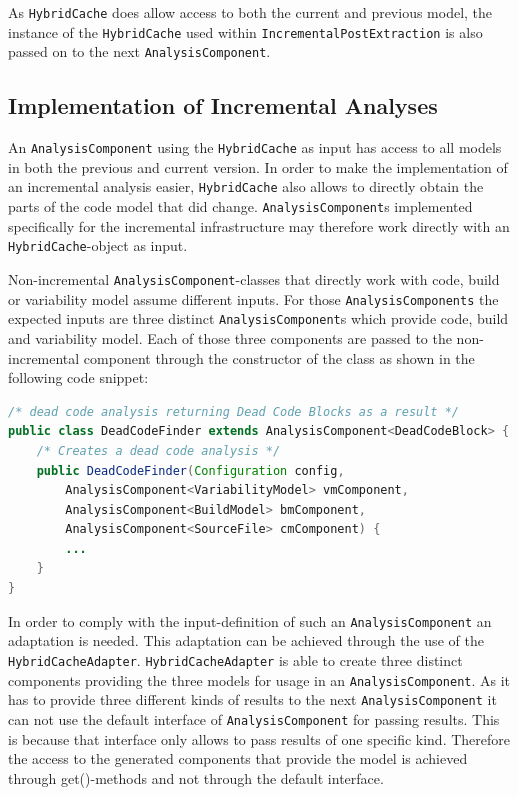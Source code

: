 \documentclass[a4paper]{article}
\begin{document}
As \texttt{Hybrid\-Cache} does allow access to both the current and previous model, the instance of the \texttt{Hybrid\-Cache} used within \texttt{Incremental\-Post\-Extraction} is also passed on to the next \texttt{Analysis\-Component}. 
  
\subsection{Implementation of Incremental Analyses}\label{incremental-analyses}

An \texttt{Analysis\-Component} using the \texttt{Hybrid\-Cache} as input has access to all models in both the previous and current version. In order to make the implementation of an incremental analysis easier, \texttt{Hybrid\-Cache} also allows to directly obtain the parts of the code model that did change. \texttt{Analysis\-Component}s implemented specifically for the incremental infrastructure may therefore work directly with an \texttt{Hybrid\-Cache}-object as input. 

Non-incremental \texttt{Analysis\-Component}-classes that directly work with code, build or variability model assume different inputs. For those \texttt{AnalysisComponents} the expected inputs are three distinct \texttt{Analysis\-Component}s which provide code, build and variability model. Each of those three components are passed to the non-incremental component through the constructor of the class as shown in the following code snippet:

\begin{lstlisting}[language=java]
/* dead code analysis returning Dead Code Blocks as a result */
public class DeadCodeFinder extends AnalysisComponent<DeadCodeBlock> {
    /* Creates a dead code analysis */
    public DeadCodeFinder(Configuration config, 
        AnalysisComponent<VariabilityModel> vmComponent, 
        AnalysisComponent<BuildModel> bmComponent, 
        AnalysisComponent<SourceFile> cmComponent) {
        ...
    }
}
\end{lstlisting}

In order to comply with the input-definition of such an \texttt{Analysis\-Component} an adaptation is needed. This adaptation can be achieved through the use of the \texttt{Hybrid\-Cache\-Adapter}. \texttt{Hybrid\-Cache\-Adapter} is able to create three distinct components providing the three models for usage in an \texttt{Analysis\-Component}. As it has to provide three different kinds of results to the next \texttt{Analysis\-Component} it can not use the default interface of \texttt{Analysis\-Component} for passing results. This is because that interface only allows to pass results of one specific kind. Therefore the access to the generated components that provide the model is achieved through get()-methods and not through the default interface. 
\end{document}

